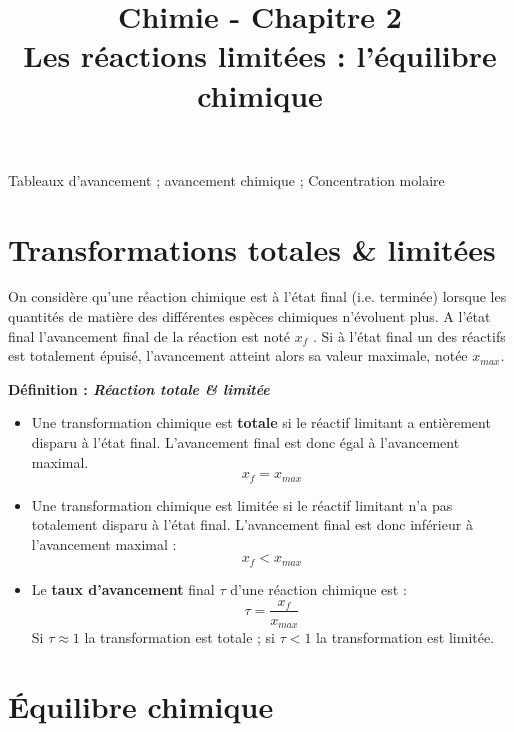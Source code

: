\documentclass[11pt,a4paper]{article}
\title{\large Chimie - Chapitre 2 \\ \LARGE  Les réactions limitées : l'équilibre chimique \\}
\date{}
\author{}
\newenvironment{defn}[1]
 {\begin{leftbar}\noindent \textbf{Définition :\textit{ \quad #1}} } { \end{leftbar}}
\begin{document}
\maketitle
\vspace{-1cm}

\begin{tcolorbox}[title=Notions de la classe de première à rappeler]
Tableaux d'avancement ; avancement chimique ; Concentration molaire
\end{tcolorbox}

\section*{Transformations totales \& limitées}

On considère qu’une réaction chimique est à l’état final (i.e. terminée) lorsque les quantités de matière des différentes espèces chimiques n’évoluent plus.  A l’état final l’avancement final de la réaction est noté $x_f$ .  Si à l’état final un des réactifs est totalement épuisé, l’avancement atteint alors sa valeur maximale, notée $x_{max}$.  

\begin{defn}{Réaction totale \& limitée}
\begin{itemize}
    \item Une transformation chimique est \textbf{totale} si le réactif limitant a entièrement disparu à l’état final.  L’avancement final est donc égal à l’avancement maximal. \[ x_f = x_{max} \]
    \item Une transformation chimique est limitée si le réactif limitant n’a pas totalement disparu à l’état final.  L’avancement final est donc inférieur à l’avancement maximal : \[ x_f < x_{max} \]
	\item Le \textbf{taux d’avancement} final $\tau$ d’une réaction chimique est : \[ \tau = \dfrac{x_f}{x_{max}} \]
	Si $ \tau \approx 1$ la transformation est totale ; si $\tau < 1$ la transformation est limitée. 
\end{itemize}
\end{defn}

\section*{Équilibre chimique}
\end{document}
